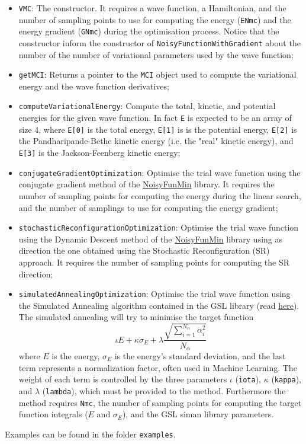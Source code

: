 \documentclass[11pt,a4paper,twoside]{article}
\begin{document}
\begin{itemize}
   \item \verb+VMC+: The constructor. It requires a wave function, a Hamiltonian, and the number of sampling points to use for computing the energy (\verb+ENmc+) and the energy gradient (\verb+GNmc+) during the optimisation process. Notice that the constructor inform the constructor of \verb+NoisyFunctionWithGradient+ about the number of the number of variational parameters used by the wave function;
   \item \verb+getMCI+: Returns a pointer to the \verb+MCI+ object used to compute the variational energy and the wave function derivatives;
   \item \verb+computeVariationalEnergy+: Compute the total, kinetic, and potential energies for the given wave function. In fact \verb+E+ is expected to be an array of size 4, where \verb+E[0]+ is the total energy, \verb+E[1]+ is is the potential energy, \verb+E[2]+ is the Pandharipande-Bethe kinetic energy (i.e. the "real" kinetic energy), and \verb+E[3]+ is the Jackson-Feenberg kinetic energy;
   \item \verb+conjugateGradientOptimization+: Optimise the trial wave function using the conjugate gradient method of the \href{https://github.com/francesco086/NoisyFunMin}{NoisyFunMin} library. It requires the number of sampling points for computing the energy during the linear search, and the number of samplings to use for computing the energy gradient;
   \item \verb+stochasticReconfigurationOptimization+: Optimise the trial wave function using the Dynamic Descent method of the \href{https://github.com/francesco086/NoisyFunMin}{NoisyFunMin} library using as direction the one obtained using the Stochastic Reconfiguration (SR) approach. It requires the number of sampling points for computing the SR direction;
   \item \verb+simulatedAnnealingOptimization+: Optimise the trial wave function using the Simulated Annealing algorithm contained in the GSL library (read \href{https://www.gnu.org/software/gsl/doc/html/siman.html}{here}). The simulated annealing will try to minimise the target function
   $$
   \iota E + \kappa \sigma_E + \lambda \frac{\sqrt{ \sum_{i=1}^{N_{\alpha}} \alpha_i^2 }}{N_{\alpha}}
   $$
   where $E$ is the energy, $\sigma_E$ is the energy's standard deviation, and the last term represents a normalization factor, often used in Machine Learning. The weight of each term is controlled by the three parameters $\iota$ (\verb+iota+), $\kappa$ (\verb+kappa+), and $\lambda$ (\verb+lambda+), which must be provided to the method. Furthermore the method requires \verb+Nmc+, the number of sampling points for computing the target function integrals ($E$ and $\sigma_E$), and the GSL siman library parameters.
\end{itemize}

Examples can be found in the folder \verb+examples+.





\printindex
\end{document}
